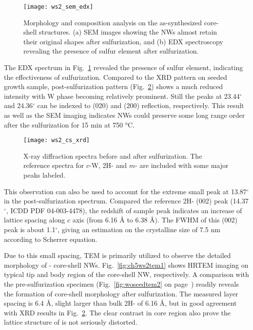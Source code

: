 \begin{figure}[htb]
\centering
\texttt{[image: ws2\_sem\_edx]}
\caption[Morphology and composition analysis on - NWs]{Morphology and composition analysis on the as-synthesized core-shell structures. (a) SEM images showing the NWs almost retain their original shapes after sulfurization, and (b) EDX spectroscopy revealing the presence of sulfur element after sulfurization.}
\label{fig:ch5ws2sem}
\end{figure}

The EDX spectrum in Fig.~\ref{fig:ch5ws2sem} revealed the presence of sulfur element, indicating the effectiveness of sulfurization. Compared to the XRD pattern on seeded growth  sample, post-sulfurization pattern (Fig.~\ref{fig:ch5ws2xrd}) shows a much reduced  intensity with W phase becoming relatively prominent. Still the peaks at 23.44$^{\circ}$ and 24.36$^{\circ}$ can be indexed to  (020) and (200) reflection, respectively. This result as well as the SEM imaging indicates  NWs could preserve some long range order after the sulfurization for 15 min at 750 \si{\degreeCelsius}. 

\begin{figure}[htb]
\centering
\texttt{[image: ws2\_cs\_xrd]}
\caption[XRD on core-shell NWs]{X-ray diffraction spectra before and after sulfurization. The reference spectra for $c$-W, 2H- and $m$- are included with some major peaks labeled.}
\label{fig:ch5ws2xrd}
\end{figure}
This observation can also be used to account for the extreme small peak at 13.87$^{\circ}$ in the post-sulfurization spectrum. Compared the reference 2H- (002) peak (14.37$^{\circ}$, ICDD PDF 04-003-4478), the redshift of sample peak indicates an increase of lattice spacing along $c$ axis (from 6.16 \si{\angstrom} to 6.38 \si{\angstrom}). The FWHM of this (002) peak is about 1.1$^{\circ}$, giving an estimation on the crystalline size of 7.5 nm according to Scherrer equation. 

Due to this small spacing, TEM is primarily utilized to observe the detailed morphology of - core-shell NWs. Fig.~\ref{fig:ch5ws2tem1} shows HRTEM imaging on typical tip and body region of the core-shell NW, respectively. A comparison with the pre-sulfurization specimen (Fig.~\ref{fig:woseedtem2} on page~\pageref{fig:woseedtem2}) readily reveals the formation of core-shell morphology after sulfurization. The measured layer spacing is 6.4 \AA, slight larger than bulk 2H- of 6.16 \AA, but in good agreement with XRD results in Fig.~\ref{fig:ch5ws2xrd}. The clear contrast in core region also prove the lattice structure of  is not seriously distorted.

